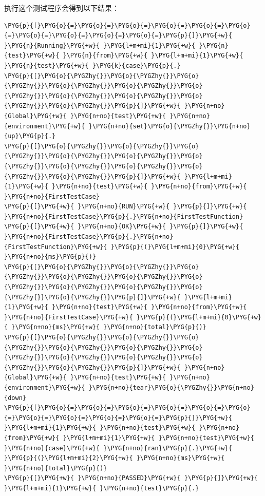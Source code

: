 
执行这个测试程序会得到以下结果：



\begin{codeblockbg}
\begin{Verbatim}[commandchars=\\\{\},breaklines=true,breakanywhere=true,fontsize=\codefont,xleftmargin=17bp]
\PYG{p}{[}\PYG{o}{=}\PYG{o}{=}\PYG{o}{=}\PYG{o}{=}\PYG{o}{=}\PYG{o}{=}\PYG{o}{=}\PYG{o}{=}\PYG{o}{=}\PYG{o}{=}\PYG{p}{]}\PYG{+w}{ }\PYG{n}{Running}\PYG{+w}{ }\PYG{l+m+mi}{1}\PYG{+w}{ }\PYG{n}{test}\PYG{+w}{ }\PYG{n}{from}\PYG{+w}{ }\PYG{l+m+mi}{1}\PYG{+w}{ }\PYG{n}{test}\PYG{+w}{ }\PYG{k}{case}\PYG{p}{.}
\PYG{p}{[}\PYG{o}{\PYGZhy{}}\PYG{o}{\PYGZhy{}}\PYG{o}{\PYGZhy{}}\PYG{o}{\PYGZhy{}}\PYG{o}{\PYGZhy{}}\PYG{o}{\PYGZhy{}}\PYG{o}{\PYGZhy{}}\PYG{o}{\PYGZhy{}}\PYG{o}{\PYGZhy{}}\PYG{o}{\PYGZhy{}}\PYG{p}{]}\PYG{+w}{ }\PYG{n+no}{Global}\PYG{+w}{ }\PYG{n+no}{test}\PYG{+w}{ }\PYG{n+no}{environment}\PYG{+w}{ }\PYG{n+no}{set}\PYG{o}{\PYGZhy{}}\PYG{n+no}{up}\PYG{p}{.}
\PYG{p}{[}\PYG{o}{\PYGZhy{}}\PYG{o}{\PYGZhy{}}\PYG{o}{\PYGZhy{}}\PYG{o}{\PYGZhy{}}\PYG{o}{\PYGZhy{}}\PYG{o}{\PYGZhy{}}\PYG{o}{\PYGZhy{}}\PYG{o}{\PYGZhy{}}\PYG{o}{\PYGZhy{}}\PYG{o}{\PYGZhy{}}\PYG{p}{]}\PYG{+w}{ }\PYG{l+m+mi}{1}\PYG{+w}{ }\PYG{n+no}{test}\PYG{+w}{ }\PYG{n+no}{from}\PYG{+w}{ }\PYG{n+no}{FirstTestCase}
\PYG{p}{[}\PYG{+w}{ }\PYG{n+no}{RUN}\PYG{+w}{ }\PYG{p}{]}\PYG{+w}{ }\PYG{n+no}{FirstTestCase}\PYG{p}{.}\PYG{n+no}{FirstTestFunction}
\PYG{p}{[}\PYG{+w}{ }\PYG{n+no}{OK}\PYG{+w}{ }\PYG{p}{]}\PYG{+w}{ }\PYG{n+no}{FirstTestCase}\PYG{p}{.}\PYG{n+no}{FirstTestFunction}\PYG{+w}{ }\PYG{p}{(}\PYG{l+m+mi}{0}\PYG{+w}{ }\PYG{n+no}{ms}\PYG{p}{)}
\PYG{p}{[}\PYG{o}{\PYGZhy{}}\PYG{o}{\PYGZhy{}}\PYG{o}{\PYGZhy{}}\PYG{o}{\PYGZhy{}}\PYG{o}{\PYGZhy{}}\PYG{o}{\PYGZhy{}}\PYG{o}{\PYGZhy{}}\PYG{o}{\PYGZhy{}}\PYG{o}{\PYGZhy{}}\PYG{o}{\PYGZhy{}}\PYG{p}{]}\PYG{+w}{ }\PYG{l+m+mi}{1}\PYG{+w}{ }\PYG{n+no}{test}\PYG{+w}{ }\PYG{n+no}{from}\PYG{+w}{ }\PYG{n+no}{FirstTestCase}\PYG{+w}{ }\PYG{p}{(}\PYG{l+m+mi}{0}\PYG{+w}{ }\PYG{n+no}{ms}\PYG{+w}{ }\PYG{n+no}{total}\PYG{p}{)}
\PYG{p}{[}\PYG{o}{\PYGZhy{}}\PYG{o}{\PYGZhy{}}\PYG{o}{\PYGZhy{}}\PYG{o}{\PYGZhy{}}\PYG{o}{\PYGZhy{}}\PYG{o}{\PYGZhy{}}\PYG{o}{\PYGZhy{}}\PYG{o}{\PYGZhy{}}\PYG{o}{\PYGZhy{}}\PYG{o}{\PYGZhy{}}\PYG{p}{]}\PYG{+w}{ }\PYG{n+no}{Global}\PYG{+w}{ }\PYG{n+no}{test}\PYG{+w}{ }\PYG{n+no}{environment}\PYG{+w}{ }\PYG{n+no}{tear}\PYG{o}{\PYGZhy{}}\PYG{n+no}{down}
\PYG{p}{[}\PYG{o}{=}\PYG{o}{=}\PYG{o}{=}\PYG{o}{=}\PYG{o}{=}\PYG{o}{=}\PYG{o}{=}\PYG{o}{=}\PYG{o}{=}\PYG{o}{=}\PYG{p}{]}\PYG{+w}{ }\PYG{l+m+mi}{1}\PYG{+w}{ }\PYG{n+no}{test}\PYG{+w}{ }\PYG{n+no}{from}\PYG{+w}{ }\PYG{l+m+mi}{1}\PYG{+w}{ }\PYG{n+no}{test}\PYG{+w}{ }\PYG{n+no}{case}\PYG{+w}{ }\PYG{n+no}{ran}\PYG{p}{.}\PYG{+w}{ }\PYG{p}{(}\PYG{l+m+mi}{2}\PYG{+w}{ }\PYG{n+no}{ms}\PYG{+w}{ }\PYG{n+no}{total}\PYG{p}{)}
\PYG{p}{[}\PYG{+w}{ }\PYG{n+no}{PASSED}\PYG{+w}{ }\PYG{p}{]}\PYG{+w}{ }\PYG{l+m+mi}{1}\PYG{+w}{ }\PYG{n+no}{test}\PYG{p}{.}
\end{Verbatim}
\end{codeblockbg}


